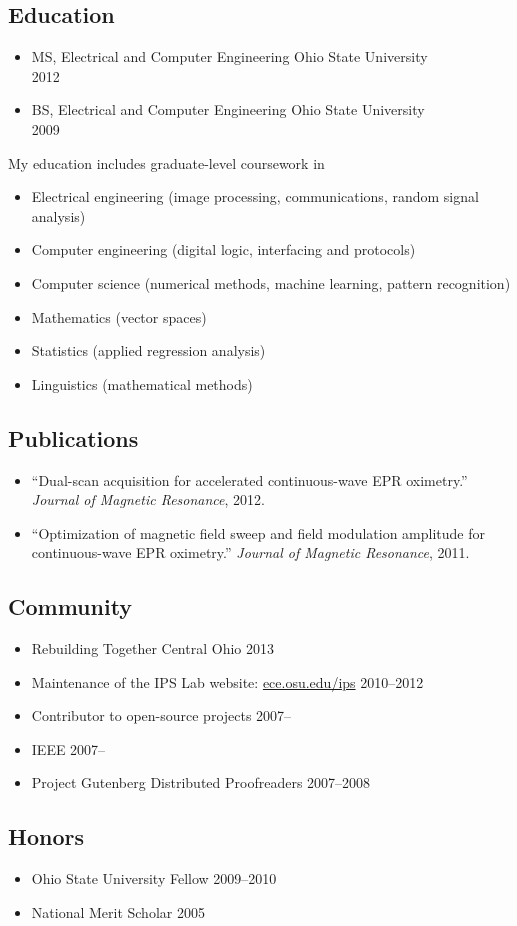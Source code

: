 \documentclass[12pt]{report}
\begin{document}
\subsection*{Education}
\begin{itemize}
\item MS, Electrical and Computer Engineering \hfill Ohio State University ~~~~~~~~~ 2012
\item BS, Electrical and Computer Engineering \hfill Ohio State University ~~~~~~~~~ 2009
\end{itemize}

My education includes graduate-level coursework in
\begin{itemize}
\item Electrical engineering (image processing, communications, random signal analysis)
\item Computer engineering (digital logic, interfacing and protocols)
\item Computer science (numerical methods, machine learning, pattern recognition)
\item Mathematics (vector spaces)
\item Statistics (applied regression analysis)
\item Linguistics (mathematical methods)
\end{itemize}

\subsection*{Publications}
\begin{itemize}
\item ``Dual-scan acquisition for accelerated continuous-wave EPR oximetry.''
{\it Journal of Magnetic Resonance}, 2012.
\item ``Optimization of magnetic field sweep and field modulation amplitude for continuous-wave EPR oximetry.''
{\it Journal of Magnetic Resonance}, 2011.
\end{itemize}

\subsection*{Community}
\begin{itemize}
\item Rebuilding Together Central Ohio                                                   \hfill 2013
\item Maintenance of the IPS Lab website: \href{http://ece.osu.edu/ips}{ece.osu.edu/ips} \hfill 2010--2012
\item Contributor to open-source projects                                                \hfill 2007--~~~~~~~
\item IEEE                                                                               \hfill 2007--~~~~~~~
\item Project Gutenberg Distributed Proofreaders                                         \hfill 2007--2008
\end{itemize}

\subsection*{Honors}
\begin{itemize}
\item Ohio State University Fellow \hfill 2009--2010
\item National Merit Scholar       \hfill 2005
\end{itemize}
\end{document}
